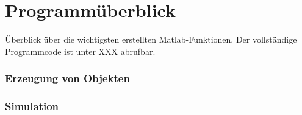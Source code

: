 \chapter{Programmüberblick}
Überblick über die wichtigsten erstellten Matlab-Funktionen. Der vollständige Programmcode ist unter XXX abrufbar.
 
\subsection*{Erzeugung von Objekten}
\begin{description}[style=nextline]
	\item[scatterObjects]
\end{description}
\subsection*{Simulation}


